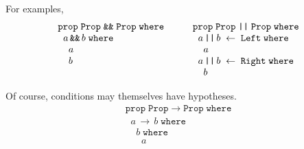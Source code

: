 \documentclass{article}
\newcommand{\prop}{\texttt{prop}}
\newcommand{\Prop}{\texttt{Prop}}
\newcommand{\where}{\texttt{where}}
\newcommand{\by}{\leftarrow}
\begin{document}
For examples,
\[
  \begin{array}[t]{l}
    \prop\;\Prop\;\texttt{\&\&}\;\Prop\;\where \\
    \;\;a\, \texttt{\&\&}\,b\;\where \\
    \;\;\;\;a\\
    \;\;\;\;b
  \end{array}
  \qquad
  \begin{array}[t]{l}
    \prop\;\Prop\;\texttt{||}\;\Prop\;\where \\
    \;\;a\, \texttt{||}\,b \;\by\;\texttt{Left}\;\where \\
    \;\;\;\;a\\
    \;\;a\, \texttt{||}\,b \;\by\;\texttt{Right}\;\where \\
    \;\;\;\;b\\
  \end{array}
\]

Of course, conditions may themselves have hypotheses.
\[\begin{array}{l}
  \prop\;\Prop\;\rightarrow\;\Prop\; \where \\
  \;\; a\,\rightarrow\,b\; \where\\
  \;\;\;\;b\; \where\\
    \;\;\;\;\;\;a
    \end{array}
\]
\end{document}
